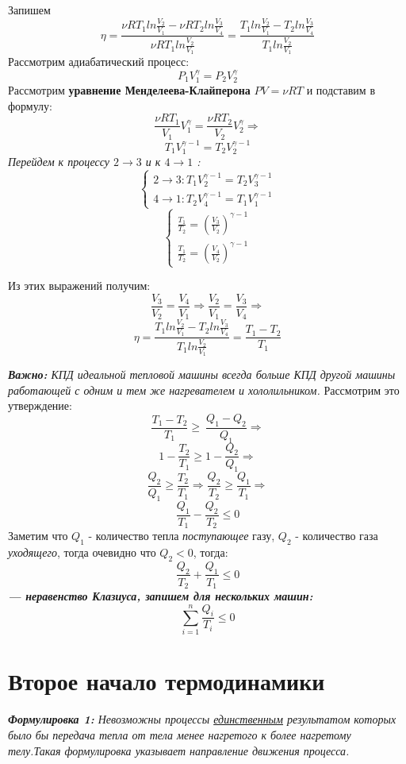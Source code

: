 \documentclass[12pt,a4paper]{report}
\begin{document}
Запишем
\[ \eta  = \frac{\nu RT_1 ln{\frac{V_2}{V_1}} - \nu RT_2 ln{\frac{V_3}{V_4}}}{\nu RT_1 ln{\frac{V_2}{V_1}}} =  \frac{T_1ln{\frac{V_2}{V_1}} - T_2ln{\frac{V_3}{V_4}}}{T_1ln{\frac{V_2}{V_1}}}\]
Рассмотрим адиабатический процесс:
\[ P_1V_1^{\gamma} = P_2V_2^{\gamma}\]
Рассмотрим \textbf{уравнение Менделеева-Клайперона }$ PV = \nu RT$ и подставим в формулу:
\[ \frac{\nu RT_1}{V_1}V_1^{\gamma} = \frac{\nu RT_2}{V_2}V_2^{\gamma} \Rightarrow \]
\[ T_1V_1^{\gamma - 1} = T_2V_2^{\gamma - 1}\]
\textit{Перейдем к процессу $2 \to 3$  и к $ 4 \to 1$ :}
\begin{equation*}
    \begin{cases}
        2 \to 3: T_1V_2^{\gamma - 1} = T_2V_3^{\gamma - 1}
        \\
        4 \to 1: T_2V_4^{\gamma - 1} = T_1V_1^{\gamma - 1}
    \end{cases}
\end{equation*}
\begin{equation*}
    \begin{cases}
        \frac{T_1}{T_2} = (\frac{V_3}{V_2}) ^ {\gamma - 1}
        \\
        \frac{T_1}{T_2} = (\frac{V_4}{V_2}) ^ {\gamma - 1}
    \end{cases}
\end{equation*}

Из этих выражений получим:
\[ \frac{V_3}{V_2} = \frac{V_4}{V_1} \Rightarrow \frac{V_2}{V_1} = \frac{V_3}{V_4} \Rightarrow\]
\[ \eta = \frac{T_1ln{\frac{V_2}{V_1}} - T_2ln{\frac{V_3}{V_4}}}{T_1ln{\frac{V_2}{V_1}}} = \frac{T_1 - T_2}{T_1}\]

\textit{\textbf{Важно: }КПД идеальной тепловой машины всегда больше КПД другой машины работающей с одним и тем же нагревателем и хололильником.} Рассмотрим это утверждение:
\[ \frac{T_1 - T_2}{T_1} \geq\ \frac{Q_1 - Q_2}{Q_1} \Rightarrow \]
\[1 - \frac{T_2}{T_1} \geq 1 - \frac{Q_2}{Q_1} \Rightarrow \]
\[ \frac{Q_2}{Q_1} \geq \frac{T_2}{T_1} \Rightarrow \frac{Q_2}{T_2} \geq \frac{Q_1}{T_1} \Rightarrow \]
\[\frac{Q_1}{T_1} - \frac{Q_2}{T_2}  \leq 0\]
Заметим что $Q_1$ - количество тепла \textit{поступающее} газу, $Q_2$ - количество газа \textit{уходящего}, тогда очевидно что $Q_2 < 0$, тогда:
\[\frac{Q_2}{T_2} + \frac{Q_1}{T_1} \leq 0\]
\textbf{\textit{ --- неравенство Клазиуса, запишем для нескольких машин:}}
\[ \sum_{i = 1}^{n} \frac{Q_i}{T_i} \leq 0\]

\section{Второе начало термодинамики}
\textit{\textbf{Формулировка 1:} Невозможны процессы \underline{единственным} результатом которых было бы передача тепла от тела менее нагретого к более нагретому телу.Такая формулировка указывает направление движения процесса.}
\end{document}

